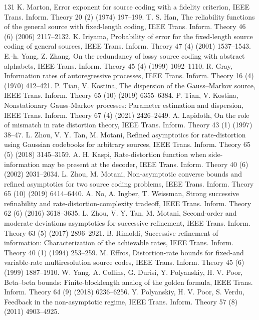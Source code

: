 \begin{thebibliography}{131}
 K. Marton, Error exponent for source coding with a fidelity criterion, IEEE Trans. Inform. Theory 20 (2) (1974) 197--199.
 T. S. Han, The reliability functions of the general source with fixed-length coding, IEEE Trans. Inform. Theory 46 (6) (2006) 2117--2132.
 K. Iriyama, Probability of error for the fixed-length source coding of general sources, IEEE Trans. Inform. Theory 47 (4) (2001) 1537--1543.
 E.-h. Yang, Z. Zhang, On the redundancy of lossy source coding with abstract alphabets, IEEE Trans. Inform. Theory 45 (4) (1999) 1092--1110.
 R. Gray, Information rates of autoregressive processes, IEEE Trans. Inform. Theory 16 (4) (1970) 412--421.
 P. Tian, V. Kostina, The dispersion of the Gauss--Markov source, IEEE Trans. Inform. Theory 65 (10) (2019) 6355--6384.
 P. Tian, V. Kostina, Nonstationary Gauss-Markov processes: Parameter estimation and dispersion, IEEE Trans. Inform. Theory 67 (4) (2021) 2426--2449.
 A. Lapidoth, On the role of mismatch in rate distortion theory, IEEE Trans. Inform. Theory 43 (1) (1997) 38--47.
 L. Zhou, V. Y. Tan, M. Motani, Refined asymptotics for rate-distortion using Gaussian codebooks for arbitrary sources, IEEE Trans. Inform. Theory 65 (5) (2018) 3145--3159.
 A. H. Kaspi, Rate-distortion function when side-information may be present at the decoder, IEEE Trans. Inform. Theory 40 (6) (2002) 2031--2034.
 L. Zhou, M. Motani, Non-asymptotic converse bounds and refined asymptotics for two source coding problems, IEEE Trans. Inform. Theory 65 (10) (2019) 6414--6440.
 A. No, A. Ingber, T. Weissman, Strong successive refinability and rate-distortion-complexity tradeoff, IEEE Trans. Inform. Theory 62 (6) (2016) 3618--3635.
 L. Zhou, V. Y. Tan, M. Motani, Second-order and moderate deviations asymptotics for successive refinement, IEEE Trans. Inform. Theory 63 (5) (2017) 2896--2921.
 B. Rimoldi, Successive refinement of information: Characterization of the achievable rates, IEEE Trans. Inform. Theory 40 (1) (1994) 253--259.
 M. Effros, Distortion-rate bounds for fixed-and variable-rate multiresolution source codes, IEEE Trans. Inform. Theory 45 (6) (1999) 1887--1910.
 W. Yang, A. Collins, G. Durisi, Y. Polyanskiy, H. V. Poor, Beta--beta bounds: Finite-blocklength analog of the golden formula, IEEE Trans. Inform. Theory 64 (9) (2018) 6236--6256.
 Y. Polyanskiy, H. V. Poor, S. Verdu, Feedback in the non-asymptotic regime, IEEE Trans. Inform. Theory 57 (8) (2011) 4903--4925.

\end{thebibliography}
